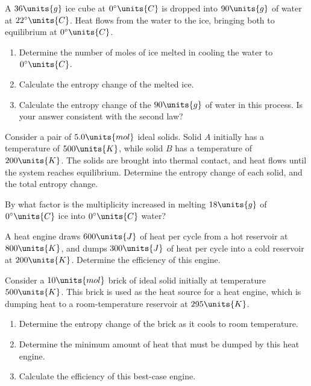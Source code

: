 \begin{problem} 
  A $36\units{g}$ ice cube at $0^\circ\units{C}$ is dropped into
  $90\units{g}$ of water at $22^\circ\units{C}$.  Heat flows from the
  water to the ice, bringing both to equilibrium at
  $0^\circ\units{C}$.
  \begin{enumerate}
  \item Determine the number of moles of ice melted in cooling the
    water to $0^\circ\units{C}$.
  \item Calculate the entropy change of the melted ice.
  \item Calculate the entropy change of the $90\units{g}$ of water 
   in this process.  Is your answer consistent
    with the second law?
  \end{enumerate}
\label{prob:iceintowater}
\end{problem}

\begin{problem}
  Consider a pair of $5.0\units{mol}$ ideal solids.  Solid $A$ initially has
  a temperature of $500\units{K}$, while solid $B$ has a temperature of
  $200\units{K}$.  The solids are brought into thermal contact, and
  heat flows until the system reaches equilibrium.
  Determine the entropy change of each solid, and the total entropy
  change. 
\end{problem}

\begin{problem}
  By what factor is the multiplicity increased in melting
  $18\units{g}$ of $0^\circ\units{C}$ ice into $0^\circ\units{C}$ water?
\label{prob:multiplicityformelting}
\end{problem}

\begin{problem} 
  A heat engine draws $600\units{J}$ of heat per cycle from a hot
  reservoir at $800\units{K}$, and dumps $300\units{J}$ of heat per
  cycle into a cold reservoir at $200\units{K}$.  Determine the
  efficiency of this engine.
\label{prob:simpleengine}
\end{problem}

\begin{problem}
  Consider a $10\units{mol}$  brick of ideal solid initially at temperature
  $500\units{K}$.  This brick is used as the heat source for a heat
  engine, which is dumping heat to a room-temperature reservoir at
  $295\units{K}$.
  \begin{enumerate}
  \item Determine the entropy change of the brick as it cools to room
    temperature.
  \item Determine the minimum amount of heat that must be dumped by
    this heat engine.
  \item Calculate the efficiency of this best-case engine.
  \end{enumerate}
\label{prob:onebrickengine}
\end{problem}


